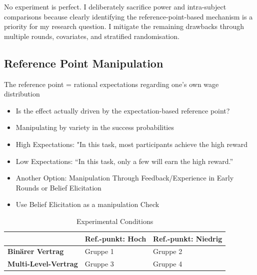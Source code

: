 \documentclass[
    11pt,
    a4paper,
    parskip=half,
    headings=normal
]{scrartcl}
\numberwithin{equation}{section}
\theoremstyle{definition}
\theoremstyle{remark}
\begin{document}
No experiment is perfect. I deliberately sacrifice power and intra-subject comparisons because clearly identifying the reference-point-based mechanism is a priority for my research question. I mitigate the remaining drawbacks through multiple rounds, covariates, and stratified randomisation.

\vspace{0.5cm}

\subsection*{Reference Point Manipulation}

The reference point = rational expectations regarding one's own wage distribution

\begin{itemize}

    \item Is the effect actually driven by the expectation-based reference point?

    \item Manipulating by variety in the success probabilities

    \item High Expectations: "In this task, most participants achieve the high reward

    \item Low Expectations: “In this task, only a few will earn the high reward.”

    \item Another Option: Manipulation Through Feedback/Experience in Early Rounds or Belief Elicitation

    \item Use Belief Elicitation as a manipulation Check

\end{itemize}

\begin{table}[htbp]
    \centering
    \caption{Experimental Conditions}
    \label{tab:experimental_conditions}
    \renewcommand{\arraystretch}{1.25}
    \begin{tabular}{>{\raggedright\arraybackslash}p{}
                    >{\centering\arraybackslash}p{}
                    >{\centering\arraybackslash}p{}}
        \toprule
        &
        \textbf{Ref.-punkt: Hoch} &
        \textbf{Ref.-punkt: Niedrig} \\
        \midrule
        \textbf{Binärer Vertrag}
        & Gruppe 1
        & Gruppe 2 \\

        \textbf{Multi-Level-Vertrag}
        & Gruppe 3
        & Gruppe 4 \\
        \bottomrule
    \end{tabular}
\end{table}
\end{document}
